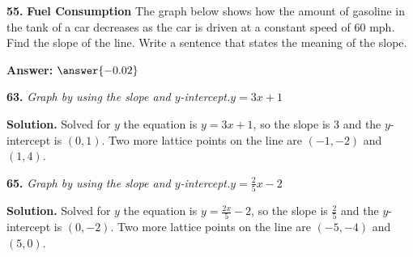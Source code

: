 \documentclass{ximera}
\begin{document}
\begin{problem}
\textbf{55.} \textbf{Fuel Consumption} The graph below shows how the amount of gasoline in the
  tank of a car decreases as the car is driven at a constant speed of 60 mph. Find the
  slope of the line. Write a sentence that states the meaning of the slope.

\textbf{Answer:} $\answer{-0.02}$
\end{problem}

\begin{problem}
\textbf{63.} \emph{Graph by using the slope and $y$-intercept.}\quad $y = 3x + 1$          \figbox{\gridsm}

\begin{hint}
\textbf{Solution.} Solved for $y$ the equation is $y=3x + 1$, so the slope is $3$ and the $y$-intercept is $(0,1)$. Two more lattice points on the line are $(-1,-2)$ and $(1,4)$.
\end{hint}
\end{problem}

\begin{problem}
\textbf{65.} \emph{Graph by using the slope and $y$-intercept.}\quad $y = \frac{2}{5}x - 2$ \figbox{\gridsm}

\begin{hint}
\textbf{Solution.} Solved for $y$ the equation is $y=\frac{2x}{5} - 2$, so the slope is $\frac{2}{5}$ and the $y$-intercept is $(0,-2)$. Two more lattice points on the line are $(-5,-4)$ and $(5,0)$.
\end{hint}
\end{problem}
\end{document}
